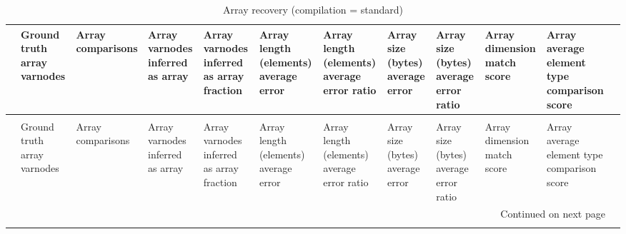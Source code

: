 \begin{longtable}{lp{1.00cm}p{1.00cm}p{1.00cm}p{1.00cm}p{1.00cm}p{1.00cm}p{1.00cm}p{1.00cm}p{1.00cm}p{1.00cm}p{1.00cm}}
\caption{Array recovery (compilation = standard)}
\label{table:array-comparisons-O0}\\
\toprule
{} &  Ground truth array varnodes &  Array comparisons &  Array varnodes inferred as array &  Array varnodes inferred as array fraction &  Array length (elements) average error &  Array length (elements) average error ratio &  Array size (bytes) average error &  Array size (bytes) average error ratio &  Array dimension match score &  Array average element type comparison score \\
\midrule
\endfirsthead
\caption[]{Array recovery (compilation = standard)} \\
\toprule
{} &  Ground truth array varnodes &  Array comparisons &  Array varnodes inferred as array &  Array varnodes inferred as array fraction &  Array length (elements) average error &  Array length (elements) average error ratio &  Array size (bytes) average error &  Array size (bytes) average error ratio &  Array dimension match score &  Array average element type comparison score \\
\midrule
\endhead
\midrule
\multicolumn{11}{r}{{Continued on next page}} \\
\midrule
\endfoot


\end{longtable}
